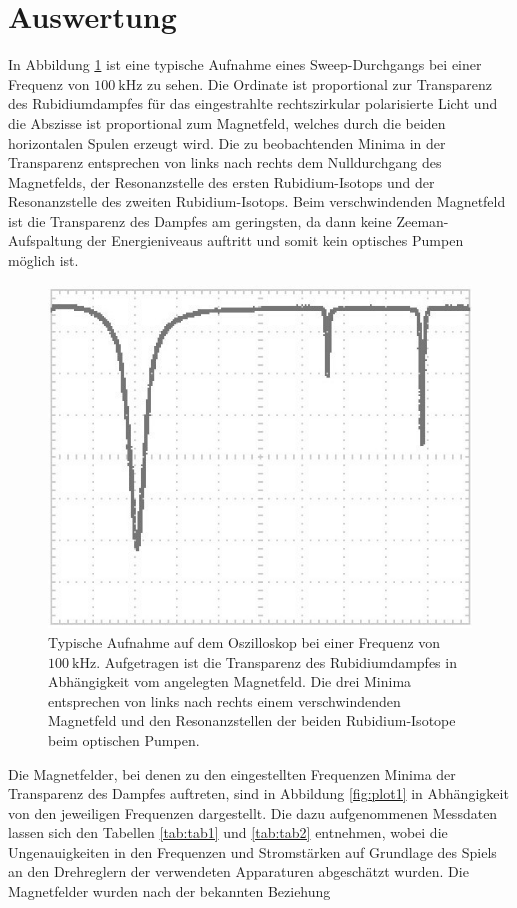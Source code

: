 \section{Auswertung}
\label{sec:Auswertung}

In Abbildung \ref{fig:oszi1_2} ist eine typische Aufnahme eines Sweep-Durchgangs bei einer Frequenz von $\SI{100}{\kilo \hertz}$ zu sehen. Die Ordinate ist proportional zur Transparenz des Rubidiumdampfes für das eingestrahlte rechtszirkular polarisierte Licht und die Abszisse ist proportional zum Magnetfeld, welches durch die beiden horizontalen Spulen erzeugt wird. Die zu beobachtenden Minima in der Transparenz entsprechen von links nach rechts dem Nulldurchgang des Magnetfelds, der Resonanzstelle des ersten Rubidium-Isotops und der Resonanzstelle des zweiten Rubidium-Isotops. Beim verschwindenden Magnetfeld ist die Transparenz des Dampfes am geringsten, da dann keine Zeeman-Aufspaltung der Energieniveaus auftritt und somit kein optisches Pumpen möglich ist.

\begin{figure}[h]
\centering
\includegraphics[width=0.7\linewidth]{img/oszi1_2}
\caption{Typische Aufnahme auf dem Oszilloskop bei einer Frequenz von $\SI{100}{\kilo \hertz}$. Aufgetragen ist die Transparenz des Rubidiumdampfes in Abhängigkeit vom angelegten Magnetfeld. Die drei Minima entsprechen von links nach rechts einem verschwindenden Magnetfeld und den Resonanzstellen der beiden Rubidium-Isotope beim optischen Pumpen.}
\label{fig:oszi1_2}
\end{figure}

Die Magnetfelder, bei denen zu den eingestellten Frequenzen Minima der Transparenz des Dampfes auftreten, sind in Abbildung \eqref{fig:plot1} in Abhängigkeit von den jeweiligen Frequenzen dargestellt. Die dazu aufgenommenen Messdaten lassen sich den Tabellen \ref{tab:tab1} und \ref{tab:tab2} entnehmen, wobei die Ungenauigkeiten in den Frequenzen und Stromstärken auf Grundlage des Spiels an den Drehreglern der verwendeten Apparaturen abgeschätzt wurden. Die Magnetfelder wurden nach der bekannten Beziehung 

